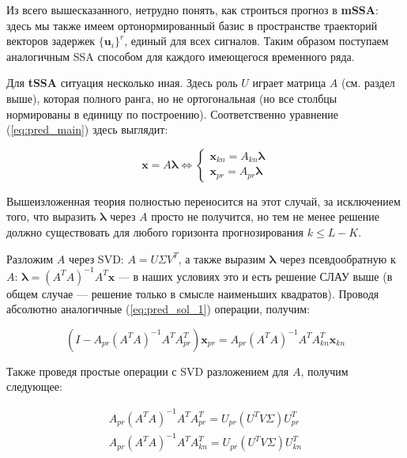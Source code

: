 			 Из всего вышесказанного, нетрудно понять, как строиться прогноз в \textbf{mSSA}: здесь мы также имеем ортонормированный базис в пространстве траекторий векторов задержек $ \{\mathbf{u}_i\}^r $, единый для всех сигналов. Таким образом поступаем аналогичным SSA способом для каждого имеющегося временного ряда.
			 
			 Для \textbf{tSSA} ситуация несколько иная. Здесь роль $ U $ играет матрица $ A $ (см. раздел выше), которая полного ранга, но не ортогональная (но все столбцы нормированы в единицу по построению). Соответственно уравнение (\ref{eq:pred_main}) здесь выглядит:
			 
			 \begin{equation}\label{eq:main_pred_for_A}
			 	\mathbf{x} = A \boldsymbol{\lambda} \Leftrightarrow \begin{cases*}
			 		\mathbf{x}_{kn} = A_{kn} \boldsymbol{\lambda} \\
			 		\mathbf{x}_{pr} = A_{pr} \boldsymbol{\lambda}
			 	\end{cases*}
			 \end{equation}
			 
			 Вышеизложенная теория полностью переносится на этот случай, за исключением того, что выразить $ \boldsymbol{\lambda} $ через $ A $ просто не получится, но тем не менее решение должно существовать для любого горизонта прогнозирования $ k \le L - K $.
			 
			 Разложим $ A $ через SVD: $ A = U \Sigma V^T $, а также выразим $ \boldsymbol{\lambda} $ через псевдообратную к $ A $: $ \boldsymbol{\lambda} = (A^T A)^{-1} A^T \mathbf{x} $ --- в наших условиях это и есть решение СЛАУ выше (в общем случае --- решение только в смысле наименьших квадратов). Проводя абсолютно аналогичные (\ref{eq:pred_sol_1}) операции, получим:
			 
			 \begin{equation*}
			 	(I - A_{pr} (A^T A)^{-1} A^T A_{pr}^T) \mathbf{x}_{pr} = A_{pr} (A^T A)^{-1} A^T A_{kn}^T \mathbf{x}_{kn}
			 \end{equation*}
			 
			 Также проведя простые операции с SVD разложением для $ A $, получим следующее:
			 
			 \begin{gather*}
			 	A_{pr} (A^T A)^{-1} A^T A_{pr}^T = U_{pr} (U^T V \Sigma) U_{pr}^T \\
			 	A_{pr} (A^T A)^{-1} A^T A_{kn}^T = U_{pr} (U^T V \Sigma) U_{kn}^T
			 \end{gather*}
			 
